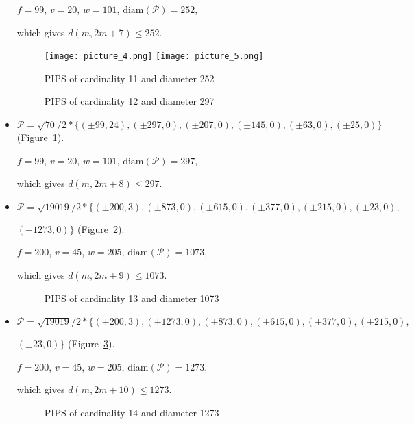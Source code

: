 \documentclass[12pt]{article}
\theoremstyle{theorem}
\theoremstyle{dfn}
\theoremstyle{remark}
\begin{document}
\begin{itemize}
$f = 99$, $v = 20$, $w = 101$, $\operatorname{diam(\mathcal{P})} = 252$,

which gives $d(m, 2m + 7) \leq 252$.


\begin{figure}[htbp]
	\texttt{[image: picture\_4.png]}
	\hfill
	\texttt{[image: picture\_5.png]}
	\\
	\parbox{.48\linewidth}{\caption{PIPS of cardinality 11 and diameter 252}
	\label{picture_4.png}}
	\hfill
	\parbox{.48\linewidth}{\caption{PIPS of cardinality 12 and diameter 297}
	\label{picture_5.png}}
\end{figure}


\item
$\mathcal{P}=\sqrt{70}/{2} * \{ (\pm 99, 24),
(\pm 297 , 0),
(\pm 207 , 0),
(\pm 145 , 0),
(\pm 63 , 0),
(\pm 25 , 0)\}
$
(Figure~\ref{picture_5.png}).

$f = 99$, $v = 20$, $w = 101$, $\operatorname{diam(\mathcal{P})} = 297$,

which gives $d(m, 2m + 8) \leq 297$.


\item
$\mathcal{P}=\sqrt{19019}/{2} * \{ (\pm 200, 3),
(\pm 873 , 0),
(\pm 615 , 0),
(\pm 377 , 0),
(\pm 215 , 0),
(\pm 23 , 0),
$

$
(-1273 , 0)\}
$
(Figure~\ref{picture_6.png}).

$f = 200$, $v = 45$, $w = 205$, $\operatorname{diam(\mathcal{P})} = 1073$,

which gives $d(m, 2m + 9) \leq 1073$.


\begin{figure}[h!]
\parbox{0.7\linewidth}{\caption{PIPS of cardinality 13 and diameter 1073}
\label{picture_6.png}}
\end{figure}


\item
$\mathcal{P}=\sqrt{19019}/{2} * \{ (\pm 200, 3),
(\pm 1273 , 0),
(\pm 873 , 0),
(\pm 615 , 0),
(\pm 377 , 0),
(\pm 215 , 0),
$

$
(\pm 23 , 0)\}
$
(Figure~\ref{picture_7.png}).

$f = 200$, $v = 45$, $w = 205$, $\operatorname{diam(\mathcal{P})} = 1273$,

which gives $d(m, 2m + 10) \leq 1273$.


\begin{figure}[h!]
\parbox{0.7\linewidth}{\caption{PIPS of cardinality 14 and diameter 1273}
\label{picture_7.png}}
\end{figure}



\end{itemize}
\end{document}
